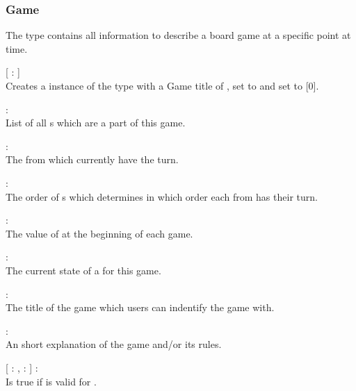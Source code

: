 \subsubsection{Game}
The  type contains all information to describe a board game at a specific point at time.

\begin{dlist}
  \item {}[ : ]\\
  Creates a instance of the  type with a Game title of ,  set to  and  set to [0].
  
  \item {} : \\
  List of all s which are a part of this game.
  
  \item {} : \\
  The  from  which currently have the turn.
  
  \item {} : \\
  The order of s which determines in which order each  from  has their turn.
  
  \item {} : \\
  The value of  at the beginning of each game.
  
  \item {} : \\
  The current state of a  for this game.
  
  \item {} : \\
  The title of the game which users can indentify the game with.
  
  \item {} : \\
  An short explanation of the game and/or its rules.
  
  \item {}[  : ,  :  ] : \\
  Is true if  is valid for .
  

\end{dlist}
